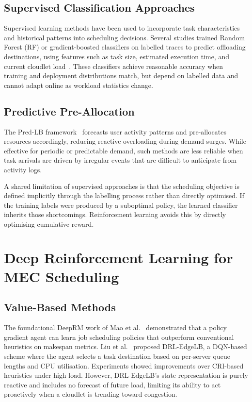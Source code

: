 \subsection{Supervised Classification Approaches}

Supervised learning methods have been used to incorporate task
characteristics and historical patterns into scheduling decisions.
Several studies trained Random Forest (RF) or gradient-boosted
classifiers on labelled traces to predict offloading destinations,
using features such as task size, estimated execution time, and
current cloudlet load~\cite{wang2019task}. These classifiers
achieve reasonable accuracy when training and deployment
distributions match, but depend on labelled data and cannot adapt
online as workload statistics change.

\subsection{Predictive Pre-Allocation}

The Pred-LB framework~\cite{predlb2025} forecasts user activity
patterns and pre-allocates resources accordingly, reducing reactive
overloading during demand surges. While effective for periodic or
predictable demand, such methods are less reliable when task
arrivals are driven by irregular events that are difficult to
anticipate from activity logs.

A shared limitation of supervised approaches is that the
scheduling objective is defined implicitly through the labelling
process rather than directly optimised. If the training labels
were produced by a suboptimal policy, the learned classifier
inherits those shortcomings. Reinforcement learning avoids this
by directly optimising cumulative reward.

\section{Deep Reinforcement Learning for MEC Scheduling}
\label{sec:lit_drl}

\subsection{Value-Based Methods}

The foundational DeepRM work of Mao et al.~\cite{mao2016resource}
demonstrated that a policy gradient agent can learn job scheduling
policies that outperform conventional heuristics on makespan
metrics. Liu et al.~\cite{liu2022edgelb} proposed DRL-EdgeLB, a
DQN-based scheme where the agent selects a task destination based
on per-server queue lengths and CPU utilisation. Experiments showed
improvements over CRI-based heuristics under high load. However,
DRL-EdgeLB's state representation is purely reactive and includes
no forecast of future load, limiting its ability to act
proactively when a cloudlet is trending toward congestion.


